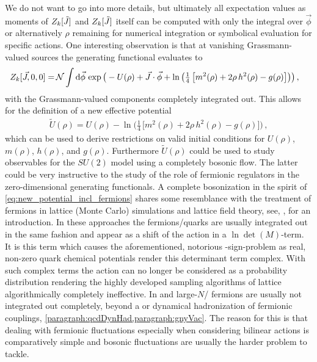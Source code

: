 We do not want to go into more details, but ultimately all expectation values as moments of $Z_k[\tilde{J}]$ and $Z_k[\tilde{J}]$ itself can be computed with only the integral over $\vec{\phi}$ or alternatively $\rho$ remaining for numerical integration or symbolical evaluation for specific actions.
One interesting observation is that at vanishing Grassmann-valued sources the generating functional evaluates to 
\begin{align}
	Z_\FSk[\vec{J}, 0 , 0 ] = \, & \mathcal{N} \int \dif\vec{\phi} \, \exp \big( - U(\rho) + \vec{J} \cdot \vec{\phi} +\ln \big(  \tfrac{1}{4} \, \big[ m^2 (\rho) + 2 \rho \, h^2 (\rho) - g(\rho) \big] \big) \big) \,, \label{eq:z_boson_fermion_boson_only}
\end{align}
with the Grassmann-valued components completely integrated out.
This allows for the definition of a new effective potential
\begin{align}
	\tilde{U}(\rho) = U(\rho) - \ln \big(  \tfrac{1}{4} \, \big[ m^2 (\rho) + 2 \rho \, h^2 (\rho) - g(\rho) \big] \big) \,,	\label{eq:new_potential_incl_fermions}
\end{align}
which can be used to derive restrictions on valid initial conditions for $U(\rho)$, $m(\rho)$, $h(\rho)$, and $g(\rho)$.
Furthermore $\tilde{U}(\rho)$ could be used to study observables for the $SU(2)$ model using a completely bosonic flow. 
The latter could be very instructive to the study of the role of fermionic regulators in the zero-dimensional \rgscaledependent{} generating functionals.
A complete bosonization in the spirit of \cref{eq:new_potential_incl_fermions} shares some resemblance with the treatment of fermions in lattice (Monte Carlo) simulations and lattice field theory, see, \eg{},  for an introduction.
In these approaches the fermions/quarks are usually integrated out in the same fashion and appear as a shift of the action in a $\ln\det(M)$-term.
It is this term which causes the aforementioned, notorious \qcd{}-sign-problem as real, non-zero quark chemical potentials render this determinant term complex.
With such complex terms the action can no longer be considered as a probability distribution rendering the highly developed sampling algorithms of lattice \qcd{} algorithmically completely ineffective.
In \frg{} and large-$N$/\mf{} fermions are usually not integrated out completely, beyond a \hsTrafoWithRefs{} or dynamical hadronization of fermionic couplings, \cf{} \cref{paragraph:qcdDynHad,paragraph:gnyVac}.
The reason for this is that dealing with fermionic fluctuations \dash{} especially when considering bilinear actions \dash{} is comparatively simple and bosonic fluctuations are usually the harder problem to tackle.\bigskip

